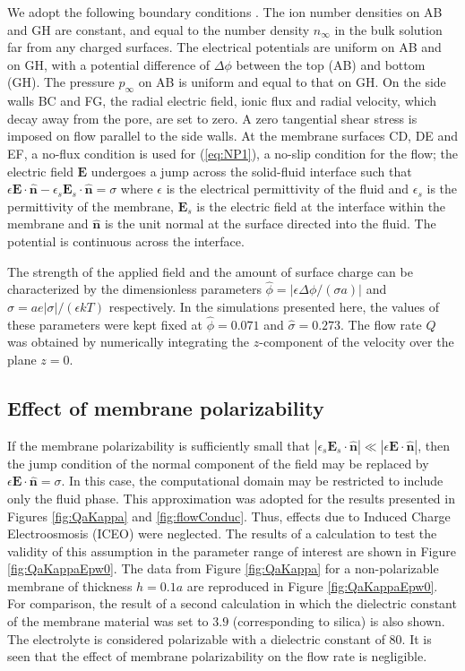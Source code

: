 We adopt the following boundary conditions \cite{Mao2013}. The ion number densities on AB and GH are constant, and equal to the number density $n_\infty$ in the bulk solution far from any charged surfaces. The electrical potentials are uniform on AB and on GH, with a potential difference of $\Delta\phi$ between the top (AB) and bottom (GH). The pressure $p_{\infty}$ on AB is uniform and equal to that on GH. On the side walls BC and FG, the radial electric field, ionic flux and radial velocity, which decay away from the pore, are set to zero. A zero tangential shear stress is imposed on flow parallel to the side walls. At the membrane surfaces CD, DE and EF, a no-flux condition is used for 
(\ref{eq:NP1}), a no-slip condition for the flow; the electric field $\mathbf{E}$ undergoes a jump across the solid-fluid interface such that
$\epsilon \mathbf{E} \cdot  \hat{\mathbf{n}} - \epsilon_{s} \mathbf{E}_{s} \cdot \hat{\mathbf{n}} = \sigma$ 
where $\epsilon$ is the electrical permittivity of the
fluid and $\epsilon_{s}$ is the permittivity of the membrane, $\mathbf{E}_{s}$ is the electric field 
at the interface within the membrane and $\hat{\mathbf{n}}$ is the unit normal at the surface directed 
into the fluid. The potential is continuous across the interface. 

The strength of the applied field and the amount of surface charge can be characterized 
by the dimensionless parameters $\hat{\phi} = |\epsilon \Delta \phi/(\sigma a)|$ and 
$\hat{\sigma} = a e |\sigma | / (\epsilon kT)$ respectively. In the simulations presented here, 
the values of these parameters were kept fixed at $\hat{\phi}=0.071$ and $\hat{\sigma} = 0.273$.
The flow rate $Q$ was obtained by numerically integrating the $z$-component of the velocity over the plane $z=0$.

\subsection{Effect of membrane polarizability}
If the membrane polarizability is sufficiently small that
$|\epsilon_{s} \mathbf{E}_{s} \cdot \hat{\mathbf{n}}|\ll|\epsilon \mathbf{E} \cdot  \hat{\mathbf{n}}|$, then the jump condition of the normal component of the field may be replaced by
 $\epsilon \mathbf{E} \cdot \hat{\mathbf{n}} = \sigma$. 
In this case, the computational domain may be restricted to include only the fluid phase. This approximation was adopted for the results presented in Figures \ref{fig:QaKappa} and
\ref{fig:flowConduc}.
Thus, effects due to Induced Charge Electroosmosis (ICEO) were neglected. 
The results of a calculation to test the validity of this assumption in the parameter range 
of interest are shown in Figure \ref{fig:QaKappaEpw0}. The data from Figure \ref{fig:QaKappa} for a non-polarizable membrane of thickness $h = 0.1a$ are reproduced in Figure \ref{fig:QaKappaEpw0}. 
 For comparison, the result of a second calculation in which the dielectric constant of 
the membrane material was set to $3.9$ (corresponding to silica) is also shown. The electrolyte 
is considered polarizable with a dielectric constant of $80$. It is seen that 
the effect of membrane polarizability on the flow rate is negligible.

